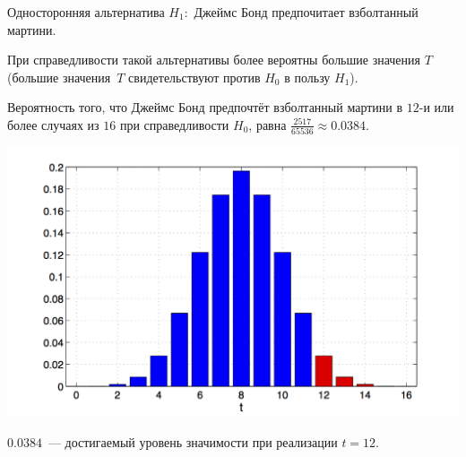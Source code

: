 \documentclass[11pt,pdf,utf8,hyperref={unicode},aspectratio=169]{beamer}
\begin{document}
\begin{frame}{Односторонняя альтернатива}
	\alert{$H_1\colon$ Джеймс Бонд предпочитает взболтанный мартини.}

    \medskip
	При справедливости такой альтернативы более вероятны большие значения $T$ (большие значения~$T$ свидетельствуют против $H_0$ в пользу $H_1$).

    \medskip
	Вероятность того, что Джеймс Бонд предпочтёт взболтанный мартини в $12$-и или более случаях из $16$ при справедливости $H_0$, равна $\frac{2517}{65536}\approx 0.0384$.

    \begin{center}
		\includegraphics[height=0.5\textheight]{bond2.png}
	\end{center}
	$0.0384$~--- достигаемый уровень значимости при реализации $t=12$.
\end{frame}
\end{document}
